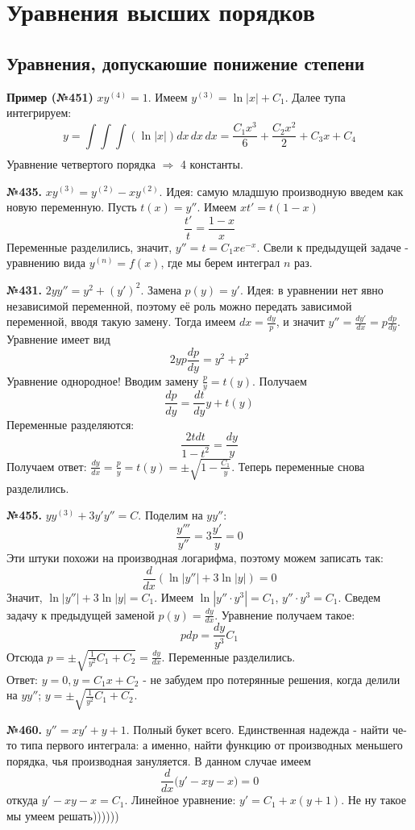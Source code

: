 \newpage
\section{Уравнения высших порядков}
\subsection{Уравнения, допускаюшие понижение степени}
\textbf{Пример (№451)} $xy^{(4)}=1$. 
Имеем $y^{(3)}=\ln|x|+C_1$. Далее тупа интегрируем:
$$y=\int\limits_{}^{}\int\limits_{}^{}\int\limits_{}^{}(\ln|x|)dx\,dx\,dx=
\frac{C_1x^3}{6}+\frac{C_2x^2}{2}+C_3x+C_4$$
Уравнение четвертого порядка $\Rightarrow$ 4 константы. 

\textbf{№435.} $xy^{(3)}=y^{(2)}-xy^{(2)}$. Идея: самую младшую производную
введем как новую переменную.
Пусть $t(x)=y''$. Имеем  $xt'=t(1-x)$
 $$\frac{t'}{t}=\frac{1-x}{x}$$
 Переменные разделились, значит, $y''=t=C_1xe^{-x}$. Свели к предыдущей 
 задаче - уравнению вида $y^{(n)}=f(x)$, где мы берем интеграл $n$ раз.

\textbf{№431.} $2yy''=y^2+(y')^2$. Замена  $p(y)=y'$. Идея:
в уравнении нет явно независимой переменной, поэтому её роль можно 
передать зависимой переменной, вводя такую замену. 
Тогда имеем $dx=\frac{dy}{p}$, и значит
$y''=\frac{dy'}{dx} = p\frac{dp}{dy}$. 
Уравнение имеет вид
$$2yp\frac{dp}{dy}=y^2+p^2$$ 
Уравнение однородное! Вводим замену $\frac{p}{y}=t(y)$. Получаем
$$\frac{dp}{dy}=\frac{dt}{dy}y+t(y)$$ 
Переменные разделяются:
$$\frac{2{t}dt}{1-t^2}=\frac{dy}{y}$$ 
Получаем ответ: $\frac{dy}{dx}=\frac{p}{y}=t(y)=\pm\sqrt{1-\frac{C_1}{y}}$. 
Теперь переменные снова разделились.

\textbf{№455.}  $yy^{(3)}+3y'y''=C$. Поделим на $yy''$:
$$\frac{y'''}{y''}=3 \frac{y'}{y}=0$$ 
Эти штуки похожи на производная логарифма, поэтому можем записать так:
$$\frac{d}{dx}\left( \ln|y''|+3\ln|y| \right)=0$$ 
Значит, $\ln|y''|+3\ln|y|=C_1$. Имеем $\ln|y''\cdot y^3|=C_1$,
$y''\cdot y^3 = C_1$. Сведем задачу к предыдущей заменой 
$p(y)=\frac{dy}{dx}$. Уравнение получаем такое:
$$pdp=\frac{dy}{y^3}C_1$$
Отсюда $p=\pm\sqrt{\frac{1}{y^2}C_1+C_2}=\frac{dy}{dx}$.
Переменные разделились.\\
Ответ: $y=0,y=C_1x+C_2$ - не забудем про потерянные решения, когда делили на 
$yy''$; $y=\pm\sqrt{\frac{1}{y^2}C_1+C_2}$. 

\textbf{№460.} $y''=xy'+y+1$. Полный букет всего. Единственная надежда -  
найти че-то типа первого интеграла: а именно, найти функцию от производных
меньшего порядка, чья производная зануляется. В данном случае имеем
$$\frac{d}{dx}\Big(y'-xy-x\Big)=0$$ 
откуда $y'-xy-x=C_1$. Линейное уравнение:
$y'=C_1+x(y+1)$. Не ну такое мы умеем решать))))))

